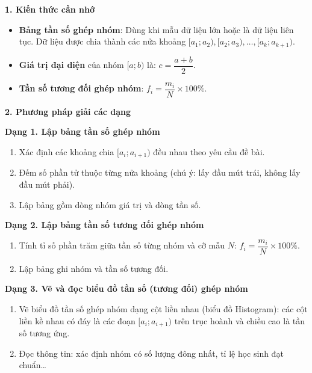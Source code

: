 \textbf{1. Kiến thức cần nhớ}
\begin{itemize}
\item \textbf{Bảng tần số ghép nhóm}: Dùng khi mẫu dữ liệu lớn hoặc là dữ liệu liên tục. Dữ liệu được chia thành các nửa khoảng $[a_1; a_2), [a_2; a_3), \dots, [a_k; a_{k+1})$.
\item \textbf{Giá trị đại diện} của nhóm $[a; b)$ là: $\boxed{c = \dfrac{a + b}{2}}$.
\item \textbf{Tần số tương đối ghép nhóm}: $f_i = \dfrac{m_i}{N} \times 100\%$.
\end{itemize}

\textbf{2. Phương pháp giải các dạng}

\textbf{Dạng 1. Lập bảng tần số ghép nhóm}
\begin{enumerate}
\item Xác định các khoảng chia $[a_i; a_{i+1})$ đều nhau theo yêu cầu đề bài.
\item Đếm số phần tử thuộc từng nửa khoảng (chú ý: lấy đầu mút trái, không lấy đầu mút phải).
\item Lập bảng gồm dòng nhóm giá trị và dòng tần số.
\end{enumerate}

\textbf{Dạng 2. Lập bảng tần số tương đối ghép nhóm}
\begin{enumerate}
\item Tính tỉ số phần trăm giữa tần số từng nhóm và cỡ mẫu $N$: $f_i = \dfrac{m_i}{N} \times 100\%$.
\item Lập bảng ghi nhóm và tần số tương đối.
\end{enumerate}

\textbf{Dạng 3. Vẽ và đọc biểu đồ tần số (tương đối) ghép nhóm}
\begin{enumerate}
\item Vẽ biểu đồ tần số ghép nhóm dạng cột liền nhau (biểu đồ Histogram): các cột liền kề nhau có đáy là các đoạn $[a_i; a_{i+1})$ trên trục hoành và chiều cao là tần số tương ứng.
\item Đọc thông tin: xác định nhóm có số lượng đông nhất, tỉ lệ học sinh đạt chuẩn\dots
\end{enumerate}
